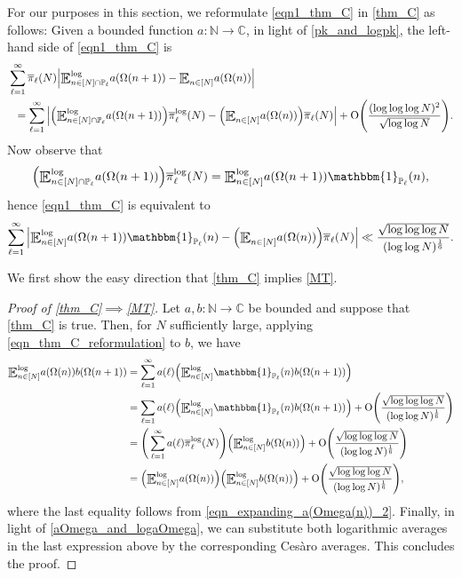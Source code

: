\documentclass[letter,11pt]{article}
\theoremstyle{plain} %
\theoremstyle{definition} %
\theoremstyle{plain}
\theoremstyle{plain}
\theoremstyle{plain}
\numberwithin{equation}{section}
\newcommand{\Cesaro}{Ces\`{a}ro}
\newcommand{\Oh}{{\mathrm O}}
\newcommand{\N}{\mathbb{N}}
\newcommand{\C}{\mathbb{C}}
\renewcommand{\P}{\mathbb{P}}
\newcommand{\E}{\raisebox{-0.4ex}{\scalebox{1.4}[1.3]{$\mathbb{E}$}}}
\newcommand{\Esub}[1]{\raisebox{-0.4ex}{\scalebox{1.4}[1.3]{$\mathbb{E}$}}\raisebox{-0.35ex}{\ensuremath{_{\scriptstyle #1}}}}
\newcommand{\logE}{{\E}^{\log}}
\newcommand{\1}{\mathbbm{1}}
\begin{document}
For our purposes in this section, we reformulate \eqref{eqn1_thm_C} in \cref{thm_C} as follows: Given a bounded function $a\colon\N\to\C$, in light of \eqref{pk_and_logpk}, the left-hand side of \eqref{eqn1_thm_C} is 
\begin{align*}
    & \sum_{\ell=1}^\infty\overline{\pi}_\ell(N)\Big|\logE_{n\in[N]\cap\P_\ell}a(\Omega(n+1)) - \Esub{n\in[N]}a(\Omega(n))\Big| \\
    & \hspace*{0.2cm} = 
    \sum_{\ell=1}^\infty\Big|\Big(\logE_{n\in[N]\cap\P_\ell}a(\Omega(n+1))\Big)\overline{\pi}^{\log}_\ell(N) - \Big(\Esub{n\in[N]}a(\Omega(n))\Big)\overline{\pi}_\ell(N)\Big| + \Oh\Bigg(\frac{(\log\log\log{N})^2}{\sqrt{\log\log{N}}}\Bigg).
\end{align*}
Now observe that 
$$\Big(\logE_{n\in[N]\cap\P_\ell}a(\Omega(n+1))\Big)\overline{\pi}^{\log}_\ell(N)
= \logE_{n\in[N]} a(\Omega(n+1))\1_{\P_\ell}(n),$$
hence \eqref{eqn1_thm_C} is equivalent to
\begin{equation}\label{eqn_thm_C_reformulation}
    \sum_{\ell=1}^\infty \Big|\logE_{n\in[N]}a(\Omega(n+1))\1_{\P_\ell}(n) - \Big(\Esub{n\in[N]}a(\Omega(n))\Big)\overline{\pi}_\ell(N)\Big|
    \ll \frac{\sqrt{\log\log\log{N}}}{(\log\log{N})^\frac{1}{6}}.
\end{equation}

We first show the easy direction that \cref{thm_C} implies \cref{MT}.

\begin{proof}[Proof of \cref{thm_C}$\implies$\cref{MT}]
    Let $a,b\colon\N\to\C$ be bounded and suppose that \cref{thm_C} is true. Then, for $N$ sufficiently large, applying \eqref{eqn_thm_C_reformulation} to $b$, we have
    \begin{align*}
        \logE_{n\in[N]} a(\Omega(n))b(\Omega(n+1))
        & = \sum_{\ell=1}^\infty a(\ell)\Big(\logE_{n\in[N]}\1_{\P_\ell}(n)b(\Omega(n+1))\Big) \\
        & = \sum_{\ell=1}a(\ell)\Big(\logE_{n\in[N]}\1_{\P_\ell}(n)b(\Omega(n+1))\Big) + \Oh\Bigg(\frac{\sqrt{\log\log\log{N}}}{(\log\log{N})^\frac{1}{6}}\Bigg) \\
        & = \Bigg(\sum_{\ell=1}^\infty a(\ell)\overline{\pi}^{\log}_{\ell}(N)\Bigg) \Big(\logE_{n\in[N]}b(\Omega(n))\Big) + \Oh\Bigg(\frac{\sqrt{\log\log\log{N}}}{(\log\log{N})^\frac{1}{6}}\Bigg) \\
        & = \Big(\logE_{n\in[N]}a(\Omega(n))\Big) \Big(\logE_{n\in[N]}b(\Omega(n))\Big) + \Oh\Bigg(\frac{\sqrt{\log\log\log{N}}}{(\log\log{N})^\frac{1}{6}}\Bigg), 
    \end{align*}
    where the last equality follows from \eqref{eqn_expanding_a(Omega(n))_2}.
    Finally, in light of \cref{aOmega_and_logaOmega}, we can substitute both logarithmic averages in the last expression above by the corresponding \Cesaro{} averages. This concludes the proof.
\end{proof}
\end{document}
